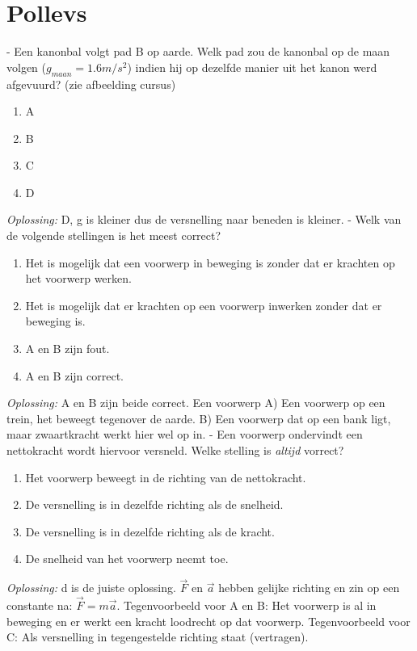 \documentclass[12pt,a4paper]{article}
\begin{document}
    \section{Pollevs}
    - Een kanonbal volgt pad B op aarde. Welk pad zou de kanonbal op de maan volgen (\(g_{maan} = 1.6m/s^2\)) indien hij op dezelfde manier uit het kanon werd afgevuurd? (zie afbeelding cursus)
    \begin{enumerate}
    	[label=\alph*)]
    	\item A
    	\item B
    	\item C
    	\item D
    \end{enumerate}
    \textit{Oplossing:} D, g is kleiner dus de versnelling naar beneden is kleiner.
    \newline
    - Welk van de volgende stellingen is het meest correct?
    \begin{enumerate}[label=\alph*]
    	\item Het is mogelijk dat een voorwerp in beweging is zonder dat er krachten op het voorwerp werken.
    	\item Het is mogelijk dat er krachten op een voorwerp inwerken zonder dat er beweging is.
    	\item A en B zijn fout.
    	\item A en B zijn correct.
    \end{enumerate}
    \textit{Oplossing:} A en B zijn beide correct. Een voorwerp A) Een voorwerp op een trein, het beweegt tegenover de aarde. B) Een voorwerp dat op een bank ligt, maar zwaartkracht werkt hier wel op in.
    \newline
    - Een voorwerp ondervindt een nettokracht wordt hiervoor versneld. Welke stelling is \textit{altijd} vorrect?
    \begin{enumerate}[label=\alph*]
    	\item Het voorwerp beweegt in de richting van de nettokracht.
    	\item De versnelling is in dezelfde richting als de snelheid.
    	\item De versnelling is in dezelfde richting als de kracht.
    	\item De snelheid van het voorwerp neemt toe.
    \end{enumerate}
    \textit{Oplossing:} d is de juiste oplossing. $\vec{F}$ en $\vec{a}$ hebben gelijke richting en zin op een constante na: \(\vec{F} = m\vec{a}\). Tegenvoorbeeld voor A en B: Het voorwerp is al in beweging en er werkt een kracht loodrecht op dat voorwerp. Tegenvoorbeeld voor C: Als versnelling in tegengestelde richting staat (vertragen).
\end{document}
